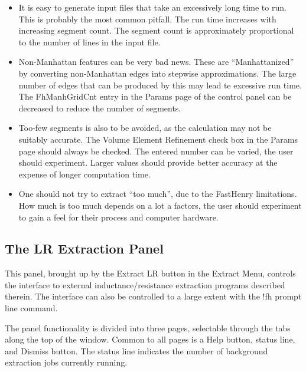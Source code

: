 \begin{itemize}
\item{It is easy to generate input files that take an excessively
long time to run.  This is probably the most common pitfall.  The
run time increases with increasing segment count.  The segment  
count is approximately proportional to the number of lines in the
input file.}

\item{Non-Manhattan features can be very bad news.  These are
``Manhattanized'' by converting non-Manhattan edges into stepwise
approximations.  The large number of edges that can be produced by
this may lead te excessive run time.  The {\cb FhManhGridCnt} entry in
the {\cb Params} page of the control panel can be decreased to reduce
the number of segments.}

\item{Too-few segments is also to be avoided, as the calculation may
not be suitably accurate.  The {\cb Volume Element Refinement} check
box in the {\cb Params} page should always be checked.  The entered
number can be varied, the user should experiment.  Larger values
should provide better accuracy at the expense of longer computation
time.}

\item{One should not try to extract ``too much'', due to the FastHenry
limitations.  How much is too much depends on a lot a factors, the
user should experiment to gain a feel for their process and computer
hardware.}
\end{itemize}


\subsection{The LR Extraction Panel}
\label{fhpanel}
This panel, brought up by the {\cb Extract LR} button in the {\cb
Extract Menu}, controls the interface to external
inductance/resistance extraction programs described therein.  The
interface can also be controlled to a large extent with the {\cb !fh}
prompt line command.

The panel functionality is divided into three pages, selectable
through the tabs along the top of the window.  Common to all pages is
a {\cb Help} button, status line, and {\cb Dismiss} button.  The
status line indicates the number of background extraction jobs
currently running.

